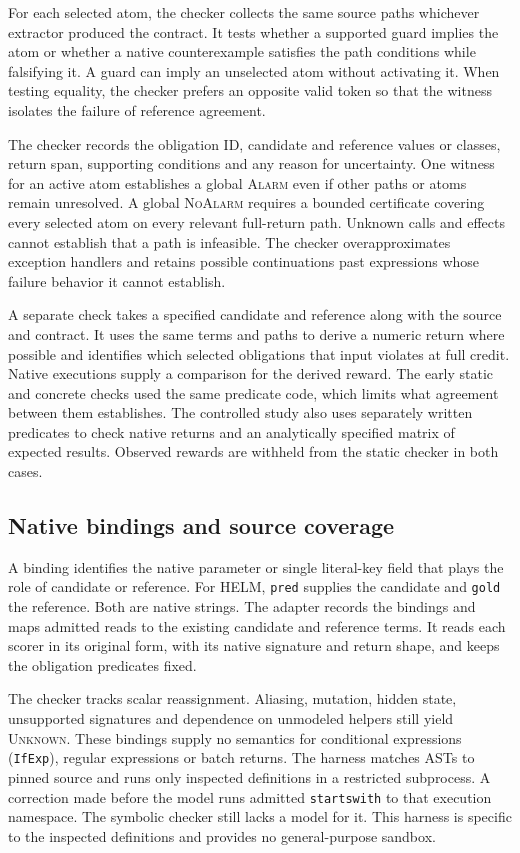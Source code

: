 \documentclass[sigconf]{acmart}
\newcommand{\Unknown}{\textsc{Unknown}}
\newcommand{\Alarm}{\textsc{Alarm}}
\newcommand{\NoAlarm}{\textsc{NoAlarm}}
\begin{document}
For each selected atom, the checker collects the same source paths whichever extractor produced the contract. It tests whether a supported guard implies the atom or whether a native counterexample satisfies the path conditions while falsifying it. A guard can imply an unselected atom without activating it. When testing equality, the checker prefers an opposite valid token so that the witness isolates the failure of reference agreement.

The checker records the obligation ID, candidate and reference values or classes, return span, supporting conditions and any reason for uncertainty. One witness for an active atom establishes a global \Alarm{} even if other paths or atoms remain unresolved. A global \NoAlarm{} requires a bounded certificate covering every selected atom on every relevant full-return path. Unknown calls and effects cannot establish that a path is infeasible. The checker overapproximates exception handlers and retains possible continuations past expressions whose failure behavior it cannot establish.

A separate check takes a specified candidate and reference along with the source and contract. It uses the same terms and paths to derive a numeric return where possible and identifies which selected obligations that input violates at full credit. Native executions supply a comparison for the derived reward. The early static and concrete checks used the same predicate code, which limits what agreement between them establishes. The controlled study also uses separately written predicates to check native returns and an analytically specified matrix of expected results. Observed rewards are withheld from the static checker in both cases.

\subsection{Native bindings and source coverage}

A binding identifies the native parameter or single literal-key field that plays the role of candidate or reference. For HELM, \texttt{pred} supplies the candidate and \texttt{gold} the reference. Both are native strings. The adapter records the bindings and maps admitted reads to the existing candidate and reference terms. It reads each scorer in its original form, with its native signature and return shape, and keeps the obligation predicates fixed.

The checker tracks scalar reassignment. Aliasing, mutation, hidden state, unsupported signatures and dependence on unmodeled helpers still yield \Unknown{}. These bindings supply no semantics for conditional expressions (\texttt{IfExp}), regular expressions or batch returns. The harness matches ASTs to pinned source and runs only inspected definitions in a restricted subprocess. A correction made before the model runs admitted \texttt{startswith} to that execution namespace. The symbolic checker still lacks a model for it. This harness is specific to the inspected definitions and provides no general-purpose sandbox.
\end{document}
